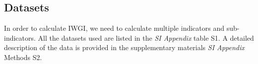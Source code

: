 \documentclass[9pt, twocolumn, twoside, lineno]{pnas-new}
\begin{document}
{		%


	\subsection*{Datasets}
	In order to calculate IWGI, we need to calculate multiple indicators and sub-indicators. All the datasets used are listed in the \textit{SI Appendix} table S1. A detailed description of the data is provided in the supplementary materials \textit{SI Appendix} Methods S2.
}

\showmatmethods{} %


\showacknow{} %


	
\end{document}
